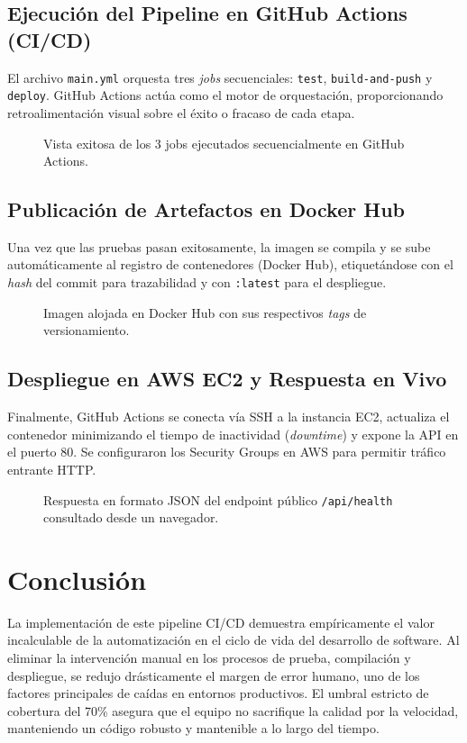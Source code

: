 \documentclass[12pt, a4paper]{article}
\begin{document}
\subsection{Ejecución del Pipeline en GitHub Actions (CI/CD)}
El archivo \texttt{main.yml} orquesta tres \textit{jobs} secuenciales: \texttt{test}, \texttt{build-and-push} y \texttt{deploy}. GitHub Actions actúa como el motor de orquestación, proporcionando retroalimentación visual sobre el éxito o fracaso de cada etapa.
\begin{figure}[H]
    \centering
    \caption{Vista exitosa de los 3 jobs ejecutados secuencialmente en GitHub Actions.}
    \label{fig:gh_actions}
\end{figure}

\subsection{Publicación de Artefactos en Docker Hub}
Una vez que las pruebas pasan exitosamente, la imagen se compila y se sube automáticamente al registro de contenedores (Docker Hub), etiquetándose con el \textit{hash} del commit para trazabilidad y con \texttt{:latest} para el despliegue.
\begin{figure}[H]
    \centering
    \caption{Imagen alojada en Docker Hub con sus respectivos \textit{tags} de versionamiento.}
    \label{fig:dockerhub}
\end{figure}

\subsection{Despliegue en AWS EC2 y Respuesta en Vivo}
Finalmente, GitHub Actions se conecta vía SSH a la instancia EC2, actualiza el contenedor minimizando el tiempo de inactividad (\textit{downtime}) y expone la API en el puerto 80. Se configuraron los Security Groups en AWS para permitir tráfico entrante HTTP.
\begin{figure}[H]
    \centering
    \caption{Respuesta en formato JSON del endpoint público \texttt{/api/health} consultado desde un navegador.}
    \label{fig:api_live}
\end{figure}

\section{Conclusión}
La implementación de este pipeline CI/CD demuestra empíricamente el valor incalculable de la automatización en el ciclo de vida del desarrollo de software. Al eliminar la intervención manual en los procesos de prueba, compilación y despliegue, se redujo drásticamente el margen de error humano, uno de los factores principales de caídas en entornos productivos. El umbral estricto de cobertura del 70\% asegura que el equipo no sacrifique la calidad por la velocidad, manteniendo un código robusto y mantenible a lo largo del tiempo.
\end{document}
